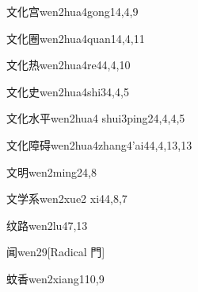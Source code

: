 \begin{verbete}{文化宫}{wen2hua4gong1}{4,4,9}
\end{verbete}

\begin{verbete}{文化圈}{wen2hua4quan1}{4,4,11}
\end{verbete}

\begin{verbete}{文化热}{wen2hua4re4}{4,4,10}
\end{verbete}

\begin{verbete}{文化史}{wen2hua4shi3}{4,4,5}
\end{verbete}

\begin{verbete}{文化水平}{wen2hua4 shui3ping2}{4,4,4,5}
\end{verbete}

\begin{verbete}{文化障碍}{wen2hua4zhang4'ai4}{4,4,13,13}
\end{verbete}

\begin{verbete}{文明}{wen2ming2}{4,8}
\end{verbete}

\begin{verbete}{文学系}{wen2xue2 xi4}{4,8,7}
\end{verbete}

\begin{verbete}{纹路}{wen2lu4}{7,13}
\end{verbete}

\begin{verbete}{闻}{wen2}{9}[Radical 門]
\end{verbete}

\begin{verbete}{蚊香}{wen2xiang1}{10,9}
\end{verbete}

